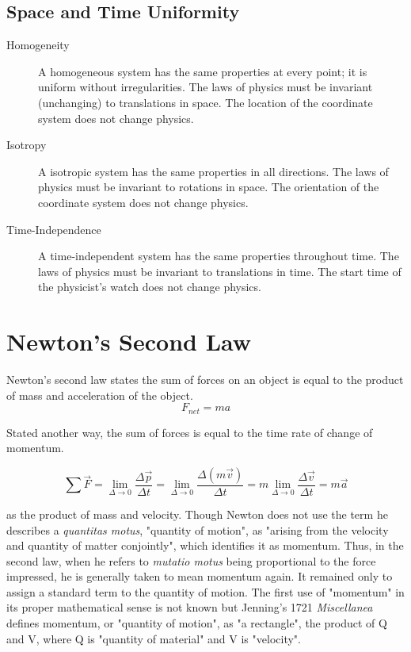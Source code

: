 \subsection{  Space and Time Uniformity}
\begin{description}
  \item [Homogeneity] A homogeneous system has the same properties at every point; it is uniform without irregularities.  The laws of physics must be invariant (unchanging) to translations in space.  The location of the coordinate system does not change physics.
  \item [Isotropy]  A isotropic system has the same properties in all directions.  The laws of physics must be invariant to rotations in space.  The orientation of the coordinate system does not change physics.  
  \item [Time-Independence] A time-independent system has the same properties throughout time.  The laws of physics must be invariant to translations in time.  The start time of the physicist's watch does not change physics.
 \end{description}








\section{Newton's Second Law}

Newton's second law states the sum of forces on an object is equal to the product of mass and acceleration of the object.
$$F_{net}=ma$$

Stated another way, the sum of forces is equal to the time rate of change of momentum.

$$\sum \overrightarrow{F}=\lim_{\Delta \rightarrow 0}\frac{\Delta \overrightarrow{p}}{\Delta t}=\lim_{\Delta \rightarrow 0}\frac{\Delta (m\overrightarrow{v})}{\Delta t}=m\lim_{\Delta \rightarrow 0}\frac{\Delta \overrightarrow{v}}{\Delta t}=m\overrightarrow{a}$$

 as the product of mass and velocity. Though Newton does not use the term he describes a \textit{quantitas motus}, "quantity of motion", as "arising from the velocity and quantity of matter conjointly", which identifies it as momentum.  Thus, in the second law, when he refers to \textit{mutatio motus} being proportional to the force impressed, he is generally taken to mean momentum again.  It remained only to assign a standard term to the quantity of motion. The first use of "momentum" in its proper mathematical sense is not known but Jenning's 1721 \textit{Miscellanea} defines momentum, or "quantity of motion", as "a rectangle", the product of Q and V, where Q is "quantity of material" and V is "velocity".  

